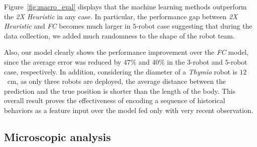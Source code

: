 \documentclass[letterpaper, 10 pt, conference]{ieeeconf}  %
\begin{document}
    Figure~\ref{fig:macro_eval} displays that the machine learning
    methods outperform the \emph{2X Heuristic} in any case. In
    particular, the performance gap between \emph{2X Heuristic} and
    \emph{FC} becomes much larger in $5$-robot case suggesting that
    during the data collection, we added much randomness to the shape of
    the robot team.

    Also, our model clearly shows the performance improvement over the
    \emph{FC} model, since the average error was reduced by $47\%$ and
    $40\%$ in the $3$-robot and $5$-robot case, respectively. In
    addition, considering the diameter of a \emph{Thymio} robot is
    $12$~cm, as only three robots are deployed, the average distance
    between the prediction and the true position is shorter than the
    length of the body. This overall result proves the effectiveness of
    encoding a sequence of historical behaviors as a feature input over
    the model fed only with very recent observation.

	\subsection{Microscopic analysis}
	\label{sec:microscopic_analysis}
\end{document}
